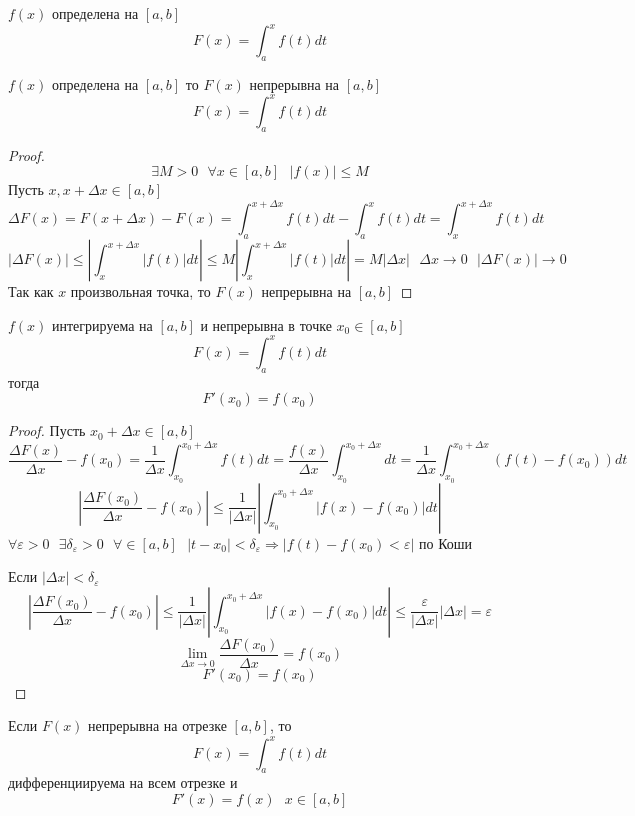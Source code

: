 $f(x)$ определена на $[a, b]$
\[F(x) = \int^x_a f(t)dt\]

\begin{theorem}
  $f(x)$ определена на $[a,b]$ то $F(x)$ непрерывна на $[a,b]$
  \[F(x) = \int^x_a f(t)dt\]
\end{theorem}

\begin{proof}
  \[\exists M > 0 ~~~ \forall x \in [a, b] ~~~ |f(x)| \le M\]
  Пусть $x, x + \Delta x \in [a, b]$
  \[\Delta F(x) = F(x + \Delta x) - F(x) = \int^{x + \Delta x}_a f(t)dt -
    \int^x_a f(t)dt = \int^{x + \Delta x}_x f(t)dt\]
  \[|\Delta F(x)| \le \left |\int^{x + \Delta x}_x |f(t)|dt \right| \le
    M \left |\int^{x + \Delta x}_x |f(t)| dt \right| = M |\Delta x|
    ~~~ \Delta x \to 0 ~~~ |\Delta F(x)| \to 0\]
  Так как $x$ произвольная точка, то $F(x)$ непрерывна на $[a,b]$
\end{proof}

\begin{theorem}
  $f(x)$ интегрируема на $[a,b]$ и непрерывна в точке $x_0 \in [a,b]$
  \[F(x) = \int^x_a f(t)dt\]
  тогда
  \[F'(x_0) = f(x_0)\]
\end{theorem}

\begin{proof}
  Пусть $x_0 + \Delta x \in [a, b]$
  \[\frac{\Delta F(x)}{\Delta x} - f(x_0) = \frac{1}{\Delta x}
    \int^{x_0 + \Delta x}_{x_0} f(t)dt = \frac{f(x)}{\Delta x}
    \int^{x_0 + \Delta x}_{x_0} dt = \frac{1}{\Delta x}
    \int^{x_0 + \Delta x}_{x_0} (f(t) - f(x_0))dt\]
  \[\left | \frac{\Delta F(x_0)}{\Delta x} - f(x_0)
    \right | \le \frac{1}{|\Delta x|} \left |
    \int^{x_0 + \Delta x}_{x_0} |f(x) - f(x_0)|dt \right |\]
  $\forall \varepsilon > 0 ~~~ \exists \delta_\varepsilon > 0
    ~~~ \forall \in [a, b] ~~~ |t - x_0| < \delta_\varepsilon \Rightarrow
    |f(t) - f(x_0) < \varepsilon|$ по Коши

  Если $|\Delta x| < \delta_\varepsilon$
  \[\left | \frac{\Delta F(x_0)}{\Delta x} - f(x_0) \right | \le
    \frac{1}{|\Delta x|} \left | \int^{x_0 + \Delta x}_{x_0} |f(x) -
    f(x_0)|dt \right | \le \frac{\varepsilon}{|\Delta x|} |\Delta x| =
    \varepsilon\]
  \[\lim_{\Delta x \to 0} \frac{\Delta F(x_0)}{\Delta x} = f(x_0)\]
  \[F'(x_0) = f(x_0)\]
\end{proof}

\begin{theorem}
  Если $F(x)$ непрерывна на отрезке $[a, b]$, то
  \[F(x) = \int^x_a f(t)dt\] дифференциируема на всем отрезке и
  \[F'(x) = f(x) ~~~ x \in [a, b]\]
\end{theorem}

